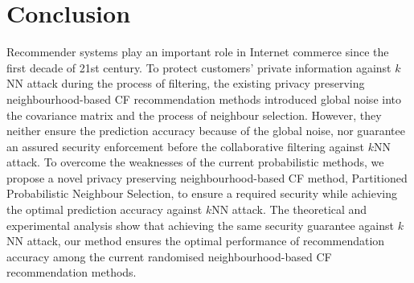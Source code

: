 \documentclass[11pt]{article}
\begin{document}
\section{Conclusion}
\label{CON}
Recommender systems play an important role in Internet commerce since the first decade of 21st century. To protect customers' private information against $k$NN attack during the process of filtering, the existing privacy preserving neighbourhood-based CF recommendation methods \cite{MCSHERRY2009,ZHU2014,ADAMOPOULOS2014} introduced global noise into the covariance matrix and the process of neighbour selection. However, they neither ensure the prediction accuracy because of the global noise, nor guarantee an assured security enforcement before the collaborative filtering against $k$NN attack. To overcome the weaknesses of the current probabilistic methods, we propose a novel privacy preserving neighbourhood-based CF method, Partitioned Probabilistic Neighbour Selection, to ensure a required security while achieving the optimal prediction accuracy against $k$NN attack. The theoretical and experimental analysis show that achieving the same security guarantee against $k$NN attack, our method ensures the optimal performance of recommendation accuracy among the current randomised neighbourhood-based CF recommendation methods.



 
\end{document}
